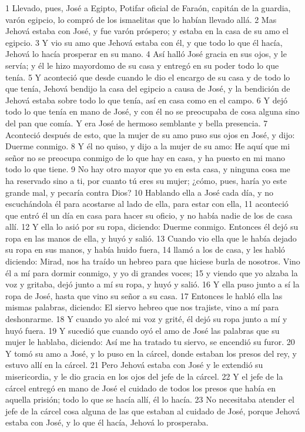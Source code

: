 1 Llevado, pues, José a Egipto, Potifar oficial de Faraón, capitán de la guardia, varón egipcio, lo compró de los ismaelitas que lo habían llevado allá.
2 Mas Jehová estaba con José, y fue varón próspero; y estaba en la casa de su amo el egipcio.
3 Y vio su amo que Jehová estaba con él, y que todo lo que él hacía, Jehová lo hacía prosperar en su mano.
4 Así halló José gracia en sus ojos, y le servía; y él le hizo mayordomo de su casa y entregó en su poder todo lo que tenía.
5 Y aconteció que desde cuando le dio el encargo de su casa y de todo lo que tenía, Jehová bendijo la casa del egipcio a causa de José, y la bendición de Jehová estaba sobre todo lo que tenía, así en casa como en el campo.
6 Y dejó todo lo que tenía en mano de José, y con él no se preocupaba de cosa alguna sino del pan que comía. Y era José de hermoso semblante y bella presencia.
7 Aconteció después de esto, que la mujer de su amo puso sus ojos en José, y dijo: Duerme conmigo.
8 Y él no quiso, y dijo a la mujer de su amo: He aquí que mi señor no se preocupa conmigo de lo que hay en casa, y ha puesto en mi mano todo lo que tiene.
9 No hay otro mayor que yo en esta casa, y ninguna cosa me ha reservado sino a ti, por cuanto tú eres su mujer; ¿cómo, pues, haría yo este grande mal, y pecaría contra Dios?
10 Hablando ella a José cada día, y no escuchándola él para acostarse al lado de ella, para estar con ella,
11 aconteció que entró él un día en casa para hacer su oficio, y no había nadie de los de casa allí.
12 Y ella lo asió por su ropa, diciendo: Duerme conmigo. Entonces él dejó su ropa en las manos de ella, y huyó y salió.
13 Cuando vio ella que le había dejado su ropa en sus manos, y había huido fuera,
14 llamó a los de casa, y les habló diciendo: Mirad, nos ha traído un hebreo para que hiciese burla de nosotros. Vino él a mí para dormir conmigo, y yo di grandes voces;
15 y viendo que yo alzaba la voz y gritaba, dejó junto a mí su ropa, y huyó y salió.
16 Y ella puso junto a sí la ropa de José, hasta que vino su señor a su casa.
17 Entonces le habló ella las mismas palabras, diciendo: El siervo hebreo que nos trajiste, vino a mí para deshonrarme.
18 Y cuando yo alcé mi voz y grité, él dejó su ropa junto a mí y huyó fuera.
19 Y sucedió que cuando oyó el amo de José las palabras que su mujer le hablaba, diciendo: Así me ha tratado tu siervo, se encendió su furor.
20 Y tomó su amo a José, y lo puso en la cárcel, donde estaban los presos del rey, y estuvo allí en la cárcel.
21 Pero Jehová estaba con José y le extendió su misericordia, y le dio gracia en los ojos del jefe de la cárcel.
22 Y el jefe de la cárcel entregó en mano de José el cuidado de todos los presos que había en aquella prisión; todo lo que se hacía allí, él lo hacía.
23 No necesitaba atender el jefe de la cárcel cosa alguna de las que estaban al cuidado de José, porque Jehová estaba con José, y lo que él hacía, Jehová lo prosperaba.

